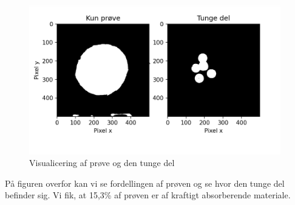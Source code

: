 \documentclass[a4paper,twoside]{article}
\begin{document}
\begin{figure}[H]
\begin{centering}
\includegraphics[height=6.5cm]{2dtungogkunprøve.png}
\hspace{1cm}
\par\end{centering}
\caption{\label{cap:2ien} Visualicering af prøve og den tunge del}
\end{figure}
På figuren overfor kan vi se fordellingen af prøven og se hvor den tunge del befinder sig. Vi fik, at 15,3\% af prøven er af kraftigt absorberende materiale. 
\end{document}
